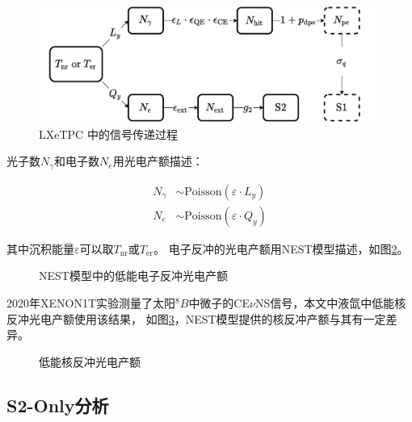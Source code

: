 \begin{figure}
    \centering
    \includegraphics[width=1.0\linewidth]{figures/signal_flow.pdf}
    \caption{\label{fig:signal_flow} LXeTPC 中的信号传递过程}
\end{figure}

光子数$N_\gamma$和电子数$N_e$用光电产额描述：

\begin{align}
    \label{eq:N_ge_lq}
    N_\gamma &\sim \mathrm{Poisson}\left(\varepsilon\cdot L_y\right) \\
    N_e &\sim \mathrm{Poisson}\left(\varepsilon\cdot Q_y\right)
\end{align}

其中沉积能量$\varepsilon$可以取$T_{\mathrm{nr}}$或$T_{\mathrm{er}}$。
电子反冲的光电产额用NEST模型描述，如图\ref{fig:lxe_er_yield}。

\begin{figure}
    \centering
    
    \caption{\label{fig:lxe_er_yield} NEST模型中的低能电子反冲光电产额\cite{lenardo_global_2015,jason_brodsky_chris_tunnell_mszydagis_jbalajth_vetri_velan_junying_huang_2019}}
\end{figure}

2020年XENON1T实验测量了太阳${}^{8}B$中微子的CE$\nu$NS信号\cite{aprile_search_2021}，本文中液氙中低能核反冲光电产额使用该结果，
如图\ref{fig:lxe_nr_yield}，NEST模型提供的核反冲产额与其有一定差异。

\begin{figure}
    \centering
    
    \caption{\label{fig:lxe_nr_yield} 低能核反冲光电产额\cite{aprile_search_2021,jason_brodsky_chris_tunnell_mszydagis_jbalajth_vetri_velan_junying_huang_2019}}
\end{figure}

\subsection{S2-Only分析}

